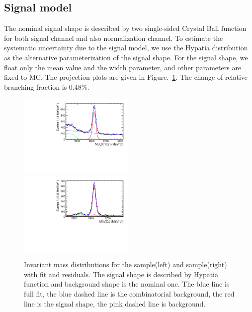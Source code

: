 \subsection{Signal model}
The nominal signal shape is described by two single-sided Crystal Ball function for both signal channel and also normalization channel. 
To estimate the systematic uncertainty due to the signal model, 
we use the Hypatia distribution as the alternative parameterization of the signal shape. 
For the signal shape, 
we float only the mean value and the width parameter, 
and other parameters are fixed to MC. The projection plots are given in Figure.~\ref{fig:signalmodel}. 
The change of relative branching fraction is 0.48\%.


\begin{figure}[hbt]
\centering
\includegraphics[width=0.5\textwidth]{Figures/05_open_charm/systematic/signal_model/Lb_LcKKPi.pdf}%
\includegraphics[width=0.5\textwidth]{Figures/05_open_charm/systematic/signal_model/Lb_LcDs.pdf}\\%
\caption{Invariant mass distributions for the \LbLckkpi sample(left) and \LbLcDs sample(right) with fit and residuals. 
The signal shape is described by Hypatia function and background shape is the nominal one.  
   The blue line is full fit, 
   the blue dashed line is the combinatorial background, 
   the red line is the signal shape, 
   the pink dashed line is \LbLckkpi background. }
\label{fig:signalmodel}
\end{figure}



